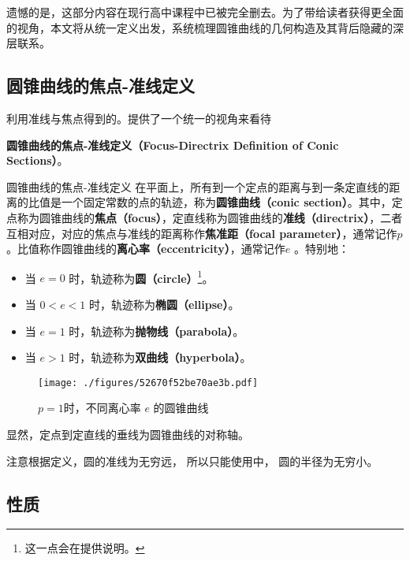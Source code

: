 遗憾的是，这部分内容在现行高中课程中已被完全删去。为了带给读者获得更全面的视角，本文将从统一定义出发，系统梳理圆锥曲线的几何构造及其背后隐藏的深层联系。


\subsection{圆锥曲线的焦点-准线定义}

利用准线与焦点得到的。提供了一个统一的视角来看待

\textbf{圆锥曲线的焦点-准线定义（Focus-Directrix Definition of Conic Sections）}。

\begin{definition}{圆锥曲线的焦点-准线定义}\label{def_HsCsFD_1}
在平面上，所有到一个定点的距离与到一条定直线的距离的比值是一个固定常数的点的轨迹，称为\textbf{圆锥曲线（conic section）}。其中，定点称为圆锥曲线的\textbf{焦点（focus）}，定直线称为圆锥曲线的\textbf{准线（directrix）}，二者互相对应，对应的焦点与准线的距离称作\textbf{焦准距（focal parameter）}，通常记作$p$。比值称作圆锥曲线的\textbf{离心率（eccentricity）}，通常记作$e$ 。特别地：
\begin{itemize}
\item 当 $e = 0$ 时，轨迹称为\textbf{圆（circle）}\footnote{这一点会在提供说明。}。
\item 当 $0 < e < 1$ 时，轨迹称为\textbf{椭圆（ellipse）}。
\item 当 $e = 1$ 时，轨迹称为\textbf{抛物线（parabola）}。
\item 当 $e > 1$ 时，轨迹称为\textbf{双曲线（hyperbola）}。
\end{itemize}
\end{definition}

\begin{figure}[ht]
\centering
\texttt{[image: ./figures/52670f52be70ae3b.pdf]}
\caption{$p = 1$时，不同离心率 $e$ 的圆锥曲线} \label{fig_Cone_2}
\end{figure}

显然，定点到定直线的垂线为圆锥曲线的对称轴。

注意根据定义，圆的准线为无穷远， 所以只能使用中， 圆的半径为无穷小。

\subsection{性质}

